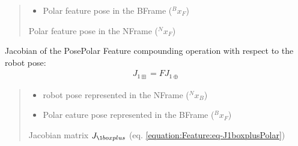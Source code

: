 \documentclass[letterpaper,10pt,english]{sphinxmanual}
\begin{document}
\begin{fulllineitems}
\begin{fulllineitems}
\begin{quote}
\begin{description}
\begin{itemize}
\item {} 
\sphinxAtStartPar
{} \textendash{} Polar feature pose in the B\sphinxhyphen{}Frame (\(^Bx_F\))

\end{itemize}

\sphinxAtStartPar
Polar feature pose in the N\sphinxhyphen{}Frame (\(^Nx_F\))

\end{description}\end{quote}

\end{fulllineitems}


\begin{fulllineitems}
\label{\detokenize{Feature:Feature.PolarFeature.J_1boxplus}}
\pysigstartsignatures
{}
\pysigstopsignatures
\sphinxAtStartPar
Jacobian of the Pose\sphinxhyphen{}Polar Feature compounding operation with respect to the robot pose:
\begin{equation}\label{equation:Feature:eq-J1boxplusPolar}
\begin{split}J_{1\boxplus} = F J_{1\oplus}\end{split}
\end{equation}\begin{quote}\begin{description}
\begin{itemize}
\item {} 
\sphinxAtStartPar
{} \textendash{} robot pose represented in the N\sphinxhyphen{}Frame (\(^Nx_B\))

\item {} 
\sphinxAtStartPar
{} \textendash{} Polar eature pose represented in the B\sphinxhyphen{}Frame (\(^Bx_F\))

\end{itemize}

\sphinxAtStartPar
Jacobian matrix \(J_{\1boxplus}\) (eq. \eqref{equation:Feature:eq-J1boxplusPolar})

\end{description}\end{quote}


\end{fulllineitems}
\end{fulllineitems}
\end{document}
